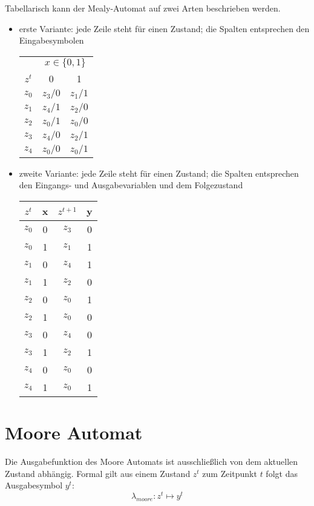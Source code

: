 Tabellarisch kann der Mealy-Automat auf zwei Arten beschrieben werden.
\begin{itemize}
  \item erste Variante: jede Zeile steht für einen Zustand; die Spalten entsprechen den Eingabesymbolen

  	\begin{tabular}{c|cc}
			& \multicolumn{2}{|c}{$x \in \{0,1\}$}\\
			$z^t$ & 0 & 1\\ \hline
			$z_0$ & $z_3 / 0$ & $z_1 / 1$\\
			$z_1$ & $z_4 / 1$ & $z_2 / 0$\\
			$z_2$ & $z_0 / 1$ & $z_0 / 0$\\
			$z_3$ & $z_4 / 0$ & $z_2 / 1$\\
			$z_4$ & $z_0 / 0$ & $z_0 / 1$\\
		\end{tabular}
  
  \item zweite Variante: jede Zeile steht für einen Zustand; die Spalten entsprechen den Eingangs- und Ausgabevariablen und dem Folgezustand
  
  \begin{tabular}{cccc}
		$z^t$ & x & $z^{t+1}$ & y\\ \hline
		$z_0$ & 0 & $z_3$ & 0\\
		$z_0$ & 1 & $z_1$ & 1\\ \hline
		$z_1$ & 0 & $z_4$ & 1\\ 
		$z_1$ & 1 & $z_2$ & 0\\ \hline
		$z_2$ & 0 & $z_0$ & 1\\ 
		$z_2$ & 1 & $z_0$ & 0\\ \hline
		$z_3$ & 0 & $z_4$ & 0\\ 
		$z_3$ & 1 & $z_2$ & 1\\ \hline
		$z_4$ & 0 & $z_0$ & 0\\
		$z_4$ & 1 & $z_0$ & 1\\
	\end{tabular}
\end{itemize}

\section{Moore Automat}
Die Ausgabefunktion des Moore Automats ist ausschließlich von dem aktuellen Zustand abhängig. Formal gilt aus einem Zustand $z^t$ zum Zeitpunkt $t$ folgt das Ausgabesymbol $y^t$:
$$
	\lambda_{moore} : z^t \mapsto y^t
$$

